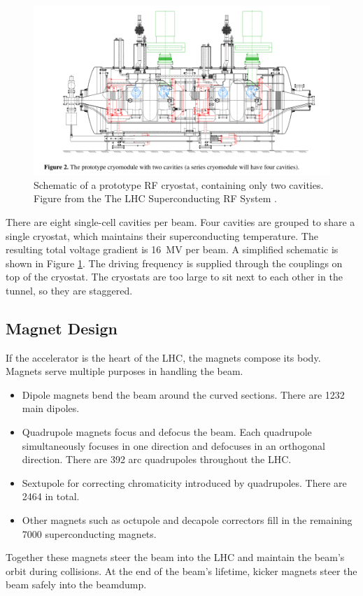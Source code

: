 \begin{figure}[h!]
\captionsetup[subfigure]{position=b}
\centering
    \includegraphics[width=1\textwidth]{figures/experiment/rfproto.png}
\caption{Schematic of a prototype RF cryostat, containing only two cavities. Figure from the The LHC Superconducting RF System \cite{boussard}.}
\label{fig:cavities}
\end{figure}

There are eight single-cell cavities per beam.
Four cavities are grouped to share a single cryostat, which maintains their superconducting temperature.
The resulting total voltage gradient is 16~MV per beam.
A simplified schematic is shown in Figure \ref{fig:cavities}.
The driving frequency is supplied through the couplings on top of the cryostat.
The cryostats are too large to sit next to each other in the tunnel, so they are staggered.

\subsection{Magnet Design}
If the accelerator is the heart of the LHC, the magnets compose its body.
Magnets serve multiple purposes in handling the beam.
\begin{itemize}
    \item Dipole magnets bend the beam around the curved sections.  There are 1232 main dipoles.
    \item Quadrupole magnets focus and defocus the beam. Each quadrupole simultaneously focuses in one direction and defocuses in an orthogonal direction. There are 392 arc quadrupoles throughout the LHC.
    \item Sextupole for correcting chromaticity introduced by quadrupoles. There are 2464 in total.
    \item Other magnets such as octupole and decapole correctors fill in the remaining 7000 superconducting magnets.
\end{itemize}
Together these magnets steer the beam into the LHC and maintain the beam's orbit during collisions.
At the end of the beam's lifetime, kicker magnets steer the beam safely into the beamdump.

